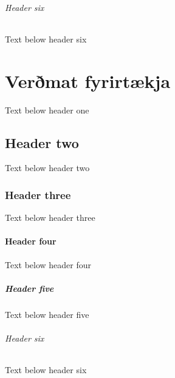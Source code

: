 \documentclass[a4paper,10pt,icelandic]{sphinxmanual}
\begin{document}
\subparagraph{Header six}
\label{\detokenize{fjarmagnskostnadur/index:header-six}}
\sphinxAtStartPar
Text below header six

\sphinxstepscope


\chapter{Verðmat fyrirtækja}
\label{\detokenize{verdmat-fyrirtaekja/index:vermat-fyrirtaekja}}\label{\detokenize{verdmat-fyrirtaekja/index::doc}}
\sphinxAtStartPar
Text below header one


\section{Header two}
\label{\detokenize{verdmat-fyrirtaekja/index:header-two}}
\sphinxAtStartPar
Text below header two


\subsection{Header three}
\label{\detokenize{verdmat-fyrirtaekja/index:header-three}}
\sphinxAtStartPar
Text below header three


\subsubsection{Header four}
\label{\detokenize{verdmat-fyrirtaekja/index:header-four}}
\sphinxAtStartPar
Text below header four


\paragraph{Header five}
\label{\detokenize{verdmat-fyrirtaekja/index:header-five}}
\sphinxAtStartPar
Text below header five


\subparagraph{Header six}
\label{\detokenize{verdmat-fyrirtaekja/index:header-six}}
\sphinxAtStartPar
Text below header six



\renewcommand{\indexname}{Atriðaskrá}
\printindex
\end{document}
